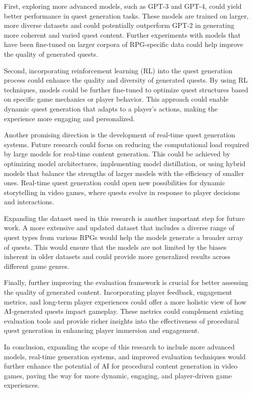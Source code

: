 First, exploring more advanced models, such as GPT-3 and GPT-4, could yield better
performance in quest generation tasks. These models are trained on larger, more diverse
datasets and could potentially outperform GPT-2 in generating more coherent and varied
quest content. Further experiments with models that have been fine-tuned on larger
corpora of RPG-specific data could help improve the quality of generated quests.

Second, incorporating reinforcement learning (RL) into the quest generation process
could enhance the quality and diversity of generated quests. By using RL techniques,
models could be further fine-tuned to optimize quest structures based on specific game
mechanics or player behavior. This approach could enable dynamic quest generation that
adapts to a player's actions, making the experience more engaging and personalized.

Another promising direction is the development of real-time quest generation systems.
Future research could focus on reducing the computational load required by large models
for real-time content generation. This could be achieved by optimizing model architectures,
implementing model distillation, or using hybrid models that balance the strengths
of larger models with the efficiency of smaller ones. Real-time quest generation could open
new possibilities for dynamic storytelling in video games, where quests evolve in response
to player decisions and interactions.

Expanding the dataset used in this research is another important step for future work.
A more extensive and updated dataset that includes a diverse range of quest types from
various RPGs would help the models generate a broader array of quests. This would
ensure that the models are not limited by the biases inherent in older datasets and could
provide more generalized results across different game genres.

Finally, further improving the evaluation framework is crucial for better assessing the
quality of generated content. Incorporating player feedback, engagement metrics, and
long-term player experiences could offer a more holistic view of how AI-generated quests
impact gameplay. These metrics could complement existing evaluation tools and provide
richer insights into the effectiveness of procedural quest generation in enhancing player
immersion and engagement.

In conclusion, expanding the scope of this research to include more advanced models,
real-time generation systems, and improved evaluation techniques would further enhance
the potential of AI for procedural content generation in video games, paving the way for
more dynamic, engaging, and player-driven game experiences.

\newpage
